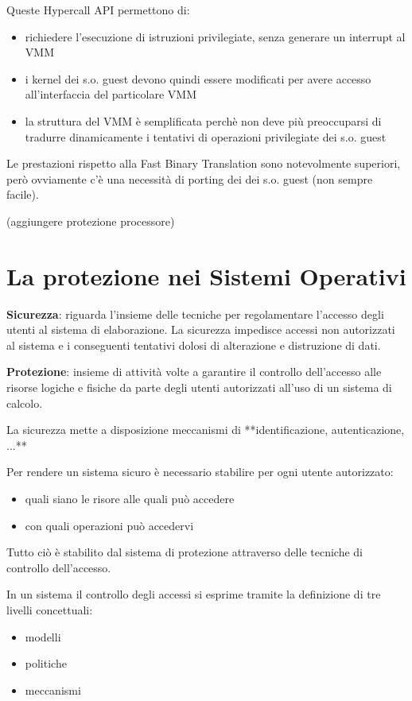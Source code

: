 \documentclass{article}
\begin{document}
Queste Hypercall API permettono di:
\begin{itemize}
    \item richiedere l'esecuzione di istruzioni privilegiate, senza generare un interrupt al VMM
    \item i kernel dei s.o. guest devono quindi essere modificati per avere accesso all'interfaccia del particolare VMM
    \item la struttura del VMM è semplificata perchè non deve più preoccuparsi di tradurre dinamicamente i tentativi di operazioni privilegiate dei s.o. guest
\end{itemize}

Le prestazioni rispetto alla Fast Binary Translation sono notevolmente superiori, però ovviamente c'è una necessità di porting dei dei s.o. guest (non sempre facile).

(aggiungere protezione processore)


\section{La protezione nei Sistemi Operativi}

\textbf{Sicurezza}: riguarda l'insieme delle tecniche per regolamentare l'accesso degli utenti al sistema di elaborazione. La sicurezza impedisce accessi
non autorizzati al sistema e i conseguenti tentativi dolosi di alterazione e distruzione di dati.

\vspace{3mm}
\textbf{Protezione}: insieme di attività volte a garantire il controllo dell'accesso alle risorse logiche e fisiche da parte degli utenti autorizzati
all'uso di un sistema di calcolo.

La sicurezza mette a disposizione meccanismi di **identificazione, autenticazione, ...**

Per rendere un sistema sicuro è necessario stabilire per ogni utente autorizzato:
\begin{itemize}
    \item quali siano le risore alle quali può accedere
    \item con quali operazioni può accedervi
\end{itemize}

Tutto ciò è stabilito dal sistema di protezione attraverso delle tecniche di controllo dell'accesso.

In un sistema il controllo degli accessi si esprime tramite la definizione di tre livelli concettuali:
\begin{itemize}
    \item modelli
    \item politiche
    \item meccanismi
\end{itemize}
\end{document}
